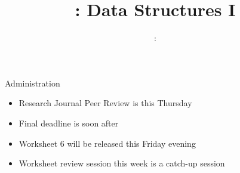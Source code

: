 \usepackage{../../beamerthemeFalmouthGamesAcademy}
\usepackage{multimedia}
\graphicspath{ {../../} }

\lstset{language=[Sharp]C
}

\usepackage[normalem]{ulem}
\usepackage{wasysym}

\usepackage{algpseudocode}

\usepackage{pdfpages}
\usepackage{qtree}

\usetikzlibrary{arrows,automata}
\usetikzlibrary{tikzmark,calc}




\title{\sessionnumber: Data Structures I}
\subtitle{\modulecode: \moduletitle}

\frame{\titlepage} 


\begin{frame}{Administration}
    \begin{itemize}
        \pause\item Research Journal Peer Review is this Thursday
        \pause\item Final deadline is soon after
        \pause\item Worksheet 6 will be released this Friday evening
        \pause\item Worksheet review session this week is a catch-up session
    \end{itemize}
\end{frame}




%
%
%

